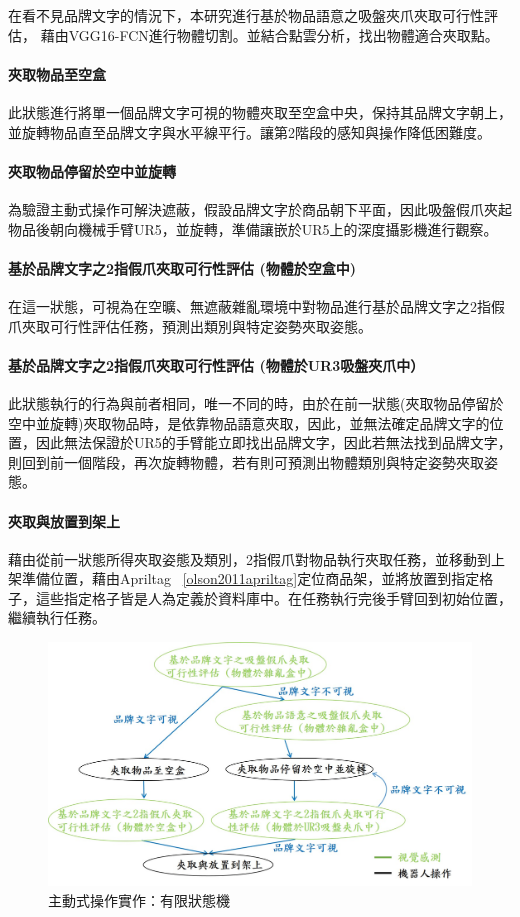 在看不見品牌文字的情況下，本研究進行基於物品語意之吸盤夾爪夾取可行性評估，
藉由VGG16-FCN進行物體切割。並結合點雲分析，找出物體適合夾取點。

\paragraph{夾取物品至空盒}
此狀態進行將單一個品牌文字可視的物體夾取至空盒中央，保持其品牌文字朝上，並旋轉物品直至品牌文字與水平線平行。讓第2階段的感知與操作降低困難度。

\paragraph{夾取物品停留於空中並旋轉}
為驗證主動式操作可解決遮蔽，假設品牌文字於商品朝下平面，因此吸盤假爪夾起物品後朝向機械手臂UR5，並旋轉，準備讓嵌於UR5上的深度攝影機進行觀察。

\paragraph{基於品牌文字之2指假爪夾取可行性評估 (物體於空盒中)}
在這一狀態，可視為在空曠、無遮蔽雜亂環境中對物品進行基於品牌文字之2指假爪夾取可行性評估任務，預測出類別與特定姿勢夾取姿態。

\paragraph{基於品牌文字之2指假爪夾取可行性評估 (物體於UR3吸盤夾爪中）}
此狀態執行的行為與前者相同，唯一不同的時，由於在前一狀態(夾取物品停留於空中並旋轉)夾取物品時，是依靠物品語意夾取，因此，並無法確定品牌文字的位置，因此無法保證於UR5的手臂能立即找出品牌文字，因此若無法找到品牌文字，則回到前一個階段，再次旋轉物體，若有則可預測出物體類別與特定姿勢夾取姿態。

\paragraph{夾取與放置到架上}
藉由從前一狀態所得夾取姿態及類別，2指假爪對物品執行夾取任務，並移動到上架準備位置，藉由Apriltag ~\ref{olson2011apriltag}定位商品架，並將放置到指定格子，這些指定格子皆是人為定義於資料庫中。在任務執行完後手臂回到初始位置，繼續執行任務。


\begin{figure}[ht]
	\centering
	\includegraphics[height=!, width=1.0\linewidth, keepaspectratio=true]
	{./figures/FSM.jpg}
  \caption{主動式操作實作：有限狀態機}
  \label{figure:fsm}
\end{figure}
